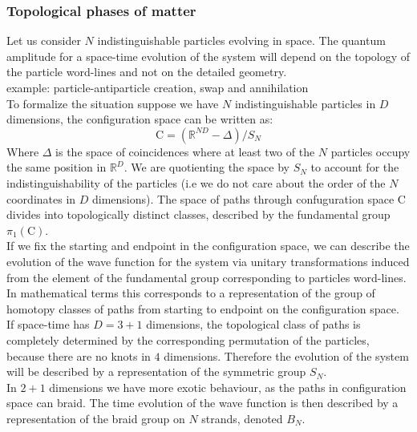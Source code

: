 \documentclass{article}
\begin{document}
\subsubsection{Topological phases of matter}
Let us consider $N$ indistinguishable particles evolving in space. The quantum amplitude for a space-time evolution of the system will depend on the topology of the particle word-lines and not on the detailed geometry. \\
example: particle-antiparticle creation, swap and annihilation\\
To formalize the situation suppose we have $N$ indistinguishable particles in $D$ dimensions, the configuration space can be written as:
$$ \mathrm{C}=(\mathbb{R}^{ND}-\Delta)/S_N$$
Where $\Delta$ is the space of coincidences where at least two of the $N$ particles occupy the same position in $\mathbb{R}^D$. We are quotienting the space by $S_N$ to account for the indistinguishability of the particles (i.e we do not care about the order of the $N$ coordinates in $D$ dimensions). The space of paths through confuguration space $\mathrm{C}$ divides into topologically distinct classes, described by the fundamental group $\pi_1(\mathrm{C})$.\\
If we fix the starting and endpoint in the configuration space, we can describe the evolution of the wave function for the system  via unitary transformations induced from the element of the fundamental group corresponding to particles word-lines. In mathematical terms this corresponds to a representation of the group of homotopy classes of paths from starting to endpoint on the configuration space. \\
If space-time has $D=3+1$ dimensions,  the topological class of paths is completely determined by the corresponding permutation of the particles, because there are no knots in $4$ dimensions. Therefore the evolution of the system will be described by a representation of the symmetric group $S_N$. \\
In $2+1$ dimensions we have more exotic behaviour, as the paths in configuration space can braid. The time evolution of the wave function is then described by a representation of the braid group on $N$ strands, denoted $B_N$.
\end{document}

